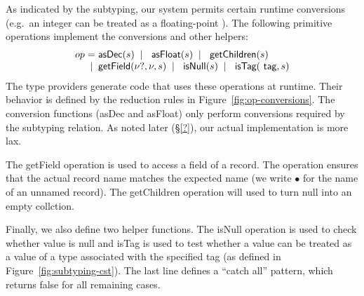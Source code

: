 \documentclass[10pt,preprint,clearpagebib]{sigplanconf}
\newcommand{\kvd}[1]{\textnormal{\textcolor{kvdclr}{\sffamily #1}}}
\newcommand{\num}[1]{\textnormal{\textcolor{numclr}{\sffamily #1}}}
\newcommand{\ident}[1]{\textnormal{\sffamily #1}}
\newcommand{\lsep}[0]{\;\; | \;\;}
\newcommand{\narrow}[1]{\hspace{-0.7em} #1 \hspace{-0.7em}}
\begin{document}
As indicated by the subtyping, our system permits certain runtime conversions (e.g.~an integer
\num{1} can be treated as a floating-point \num{1.0}). The following primitive operations 
implement the conversions and other helpers:
%
\begin{equation*}
\begin{array}{lcl}
 op  &\narrow{=}& \ident{asDec}(s) \lsep \ident{asFloat}(s) \lsep \ident{getChildren}(s) \\
     &\narrow{|}& \ident{getField}(\nu?, \nu, s) \lsep \ident{isNull}(s) \lsep \ident{isTag}(\ident{tag}, s)
\end{array}
\end{equation*}
%
The type providers generate code that uses these operations at runtime. Their behavior is defined
by the reduction rules in Figure~\ref{fig:op-conversions}. The conversion functions (\ident{asDec}
and \ident{asFloat}) only perform conversions required by the subtyping relation. As noted later
(\S\ref{?}), our actual implementation is more lax. 

The \ident{getField} operation is used to access a field of a record. The operation ensures that
the actual record name matches the expected name (we write $\bullet$ for the name of an unnamed 
record). The \ident{getChildren} operation will used to turn \kvd{null} into an empty collction.

Finally, we also define two helper functions. The \ident{isNull} operation is used to check whether 
value is \kvd{null} and \ident{isTag} is used to test whether a value can be treated as a value of 
a type associated with the specified tag (as defined in Figure~\ref{fig:subtyping-cst}).
The last line defines a ``catch all'' pattern, which returns \kvd{false} for all remaining cases.

\end{document}
